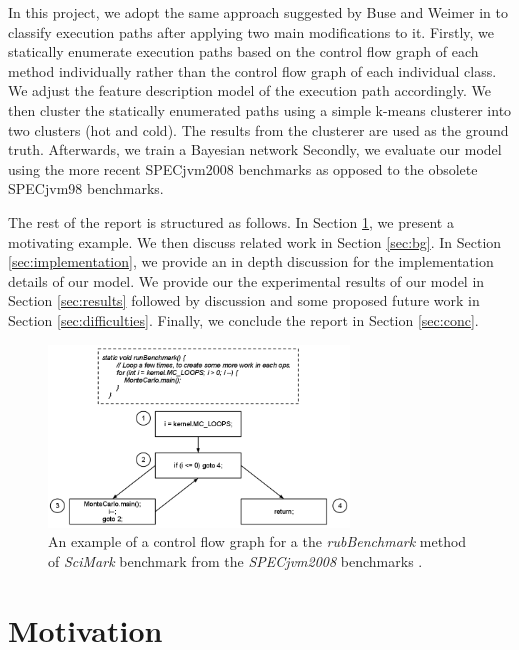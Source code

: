 \documentclass[10pt,twocolumn,letterpaper]{article}
\begin{document}
In this project, we adopt the same approach suggested by Buse and Weimer in \cite{buse2009road} to classify execution paths after applying two main
modifications to it. Firstly, we statically enumerate execution paths based on the control flow graph of each method individually rather than the control flow
graph of each individual class. We adjust the feature description model of the execution path accordingly. We then cluster the statically enumerated paths using
a simple k-means clusterer into two clusters (hot and cold). The results from the clusterer are used as the ground truth. Afterwards, we train a
Bayesian network Secondly, we evaluate our model using the more recent SPECjvm2008 \cite{specjvm2008} benchmarks as opposed to the obsolete SPECjvm98
\cite{specjvm98} benchmarks.

The rest of the report is structured as follows. In Section \ref{sec:motivation}, we present a motivating example. We then discuss related work in Section
\ref{sec:bg}. In Section \ref{sec:implementation}, we provide an in depth discussion for the implementation details of our model. We provide our the
experimental results of our model in Section \ref{sec:results} followed by discussion and some proposed future work in Section \ref{sec:difficulties}. Finally,
we conclude the report in Section \ref{sec:conc}.

\begin{figure}[t]
\centering
\includegraphics[width=8cm]{imgs/cfg.png}
\caption{An example of a control flow graph for a the \textit{rubBenchmark} method of \textit{SciMark} benchmark from the \textit{SPECjvm2008} benchmarks
\cite{specjvm2008}.}
\label{fig:cfg}
\end{figure}


\section{Motivation}
\label{sec:motivation}
\end{document}
